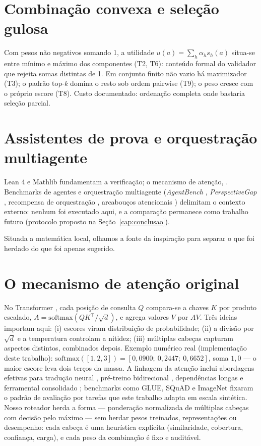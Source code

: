\documentclass[12pt,openany,oneside,a4paper,brazil,chapter=TITLE]{abntex2}
\let\cite\citep
\begin{document}
\section{Combinação convexa e seleção gulosa}
Com pesos não negativos somando 1, a utilidade $u(a)=\sum_h\alpha_h s_h(a)$ situa-se entre mínimo e máximo dos componentes (T2, T6): conteúdo formal do validador que rejeita somas distintas de 1. Em conjunto finito não vazio há maximizador (T3); o padrão top-\textit{k} domina o resto sob ordem pairwise (T9); o peso cresce com o próprio escore (T8). Custo documentado: ordenação completa onde bastaria seleção parcial.
\section{Assistentes de prova e orquestração multiagente}
Lean 4 \cite{moura2021} e Mathlib \cite{mathlib2020} fundamentam a verificação; o mecanismo de atenção, \cite{vaswani2017}. Benchmarks de agentes e orquestração multiagente (\textit{AgentBench} \cite{agentbench2023}, \textit{PerspectiveGap} \cite{perspectivegap2026}, recompensa de orquestração \cite{orchrm2026}, arcabouços atencionais \cite{orchestrator2025}) delimitam o contexto externo: nenhum foi executado aqui, e a comparação permanece como trabalho futuro (protocolo proposto na Seção~\ref{cap:conclusao}).



Situada a matemática local, olhamos a fonte da inspiração para separar o que foi herdado do que foi apenas sugerido.
\section{O mecanismo de atenção original}
No Transformer \cite{vaswani2017}, cada posição de consulta $Q$ compara-se a chaves $K$ por produto escalado, $A=\mathrm{softmax}(QK^\top/\sqrt{d})$, e agrega valores $V$ por $AV$. Três ideias importam aqui: (i) escores viram distribuição de probabilidade; (ii) a divisão por $\sqrt{d}$ e a temperatura controlam a nitidez; (iii) múltiplas cabeças capturam aspectos distintos, combinados depois. Exemplo numérico real (implementação deste trabalho): $\mathrm{softmax}([1,2,3])=[0{,}0900;\ 0{,}2447;\ 0{,}6652]$, soma $1{,}0$ --- o maior escore leva dois terços da massa. A linhagem da atenção inclui abordagens efetivas para tradução neural \cite{luong2015}, pré-treino bidirecional \cite{devlin2019}, dependências longas \cite{dai2019} e ferramental consolidado \cite{wolf2020}; benchmarks como GLUE, SQuAD e ImageNet \cite{wang2018,rajpurkar2016,deng2009} fixaram o padrão de avaliação por tarefas que este trabalho adapta em escala sintética. Nosso roteador herda a forma --- ponderação normalizada de múltiplas cabeças com decisão pelo máximo --- sem herdar pesos treinados, representações ou desempenho: cada cabeça é uma heurística explícita (similaridade, cobertura, confiança, carga), e cada peso da combinação é fixo e auditável.
\end{document}
